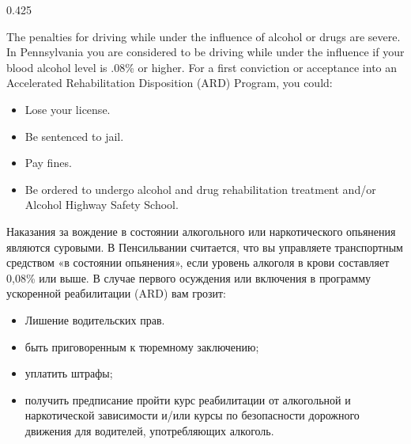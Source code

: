 \begin{langblock}{0.425}
	\begin{eng}
	
	The penalties for driving while under the influence of alcohol or drugs are severe. In Pennsylvania you are considered to be driving while under the influence if your blood alcohol level is .08\% or higher. For a first conviction or acceptance into an Accelerated Rehabilitation Disposition (ARD) Program, you could:
	
	\begin{itemize}[noitemsep]
		\item Lose your license.
		\item Be sentenced to jail.
		\item Pay fines.
		\item Be ordered to undergo alcohol and drug rehabilitation treatment and/or Alcohol Highway Safety School.
	\end{itemize}
	\end{eng}
	\begin{rus}
		
		Наказания за вождение в состоянии алкогольного или наркотического опьянения являются суровыми. В Пенсильвании считается, что вы управляете транспортным средством «в состоянии опьянения», если уровень алкоголя в крови составляет 0,08\% или выше. В случае первого осуждения или включения в программу ускоренной реабилитации (ARD) вам грозит:
		
		\begin{itemize}[noitemsep]
			\item Лишение водительских прав.
			\item быть приговоренным к тюремному заключению;
			\item уплатить штрафы;
			\item получить предписание пройти курс реабилитации от алкогольной и наркотической зависимости и/или курсы по безопасности дорожного движения для водителей, употребляющих алкоголь.
		\end{itemize}
\end{rus}
\end{langblock}





